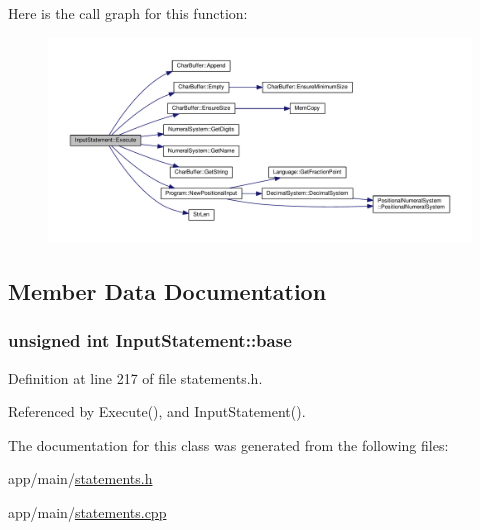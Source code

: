 Here is the call graph for this function\+:\nopagebreak
\begin{figure}[H]
\begin{center}
\leavevmode
\includegraphics[width=350pt]{classInputStatement_ac4a9288ba2fe5002ae78d65c270222a5_cgraph}
\end{center}
\end{figure}




\subsection{Member Data Documentation}
\subsubsection[{\texorpdfstring{base}{base}}]{\setlength{\rightskip}{0pt plus 5cm}unsigned int Input\+Statement\+::base\hspace{0.3cm}{\ttfamily [private]}}\hypertarget{classInputStatement_aa36f7a6bcb8f164a2b6c910f7199fe9b}{}\label{classInputStatement_aa36f7a6bcb8f164a2b6c910f7199fe9b}


Definition at line 217 of file statements.\+h.



Referenced by Execute(), and Input\+Statement().



The documentation for this class was generated from the following files\+:\begin{DoxyCompactItemize}
\item 
app/main/\hyperlink{statements_8h}{statements.\+h}\item 
app/main/\hyperlink{statements_8cpp}{statements.\+cpp}\end{DoxyCompactItemize}
